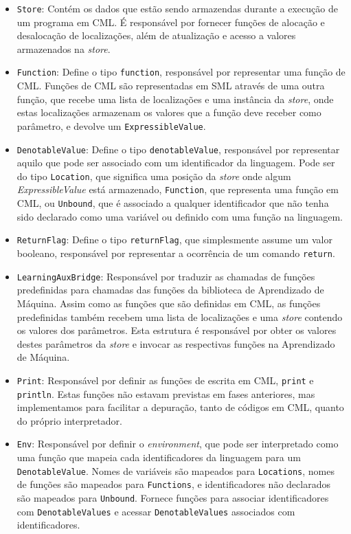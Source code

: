 \documentclass[12pt]{article}
\begin{document}
\begin{enumerate}
\begin{itemize}
\item \texttt{Store}: Contém os dados que estão sendo armazendas durante a execução de um programa em CML. É responsável por fornecer funções de alocação e desalocação de localizações, além de atualização e acesso a valores armazenados na \textit{store}.

\item \texttt{Function}: Define o tipo \texttt{function}, responsável por representar uma função de CML. Funções de CML são representadas em SML através de uma outra função, que recebe uma lista de localizações e uma instância da \textit{store}, onde estas localizações armazenam os valores que a função deve receber como parâmetro, e devolve um \texttt{ExpressibleValue}.

\item \texttt{DenotableValue}: Define o tipo \texttt{denotableValue}, responsável por representar aquilo que pode ser associado com um identificador da linguagem. Pode ser do tipo \texttt{Location}, que significa uma posição da \textit{store} onde algum  \textit{ExpressibleValue} está armazenado, \texttt{Function}, que representa uma função em CML, ou \texttt{Unbound}, que é associado a qualquer identificador que não tenha sido declarado como uma variável ou definido com uma função na linguagem.

\item \texttt{ReturnFlag}: Define o tipo \texttt{returnFlag}, que simplesmente assume um valor booleano, responsável por representar a ocorrência de um comando \texttt{return}.

\item \texttt{LearningAuxBridge}: Responsável por traduzir as chamadas de funções predefinidas para chamadas das funções da biblioteca de Aprendizado de Máquina. Assim como as funções que são definidas em CML, as funções predefinidas também recebem uma lista de localizações e uma \textit{store} contendo os valores dos parâmetros. Esta estrutura é responsável por obter os valores destes parâmetros da \textit{store} e invocar as respectivas funções na Aprendizado de Máquina.

\item \texttt{Print}: Responsável por definir as funções de escrita em CML, \texttt{print} e \texttt{println}. Estas funções não estavam previstas em fases anteriores, mas implementamos para facilitar a depuração, tanto de códigos em CML, quanto do próprio interpretador.
 
\item \texttt{Env}: Responsável por definir o \textit{environment}, que pode ser interpretado como uma função que mapeia cada identificadores da linguagem para um \texttt{DenotableValue}. Nomes de variáveis são mapeados para \texttt{Locations}, nomes de funções são mapeados para \texttt{Functions}, e identificadores não declarados são mapeados para \texttt{Unbound}. Fornece funções para associar identificadores com \texttt{DenotableValues} e acessar \texttt{DenotableValues} associados com identificadores.


\end{itemize}
\end{enumerate}
\end{document}
